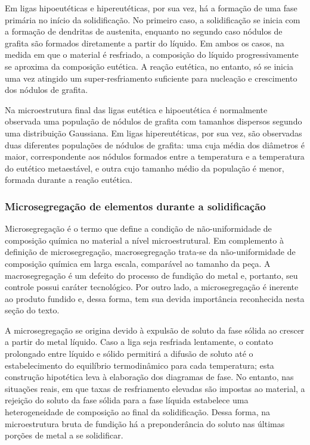 Em ligas hipoeutéticas e hipereutéticas, por sua vez, há a formação de uma fase primária no início da solidificação. No primeiro caso, a solidificação se inicia com a formação de dendritas de austenita, enquanto no segundo caso nódulos de grafita são formados diretamente a partir do líquido. Em ambos os casos, na medida em que o material é resfriado, a composição do líquido progressivamente se aproxima da composição eutética. A reação eutética, no entanto, só se inicia uma vez atingido um super-resfriamento suficiente para nucleação e crescimento dos nódulos de grafita\cite{Santos1991}.

Na microestrutura final das ligas eutética e hipoeutética é normalmente observada uma população de nódulos de grafita com tamanhos dispersos segundo uma distribuição Gaussiana. Em ligas hipereutéticas, por sua vez, são observadas duas diferentes populações de nódulos de grafita: uma cuja média dos diâmetros é maior, correspondente aos nódulos formados entre a temperatura  e a temperatura do eutético metaestável, e outra cujo tamanho médio da população é menor, formada durante a reação eutética\cite{Santos1991}. %

\subsubsection{Microsegrega\c{c}\~{a}o de elementos durante a solidifica\c{c}\~{a}o}

Microsegregação é o termo que define a condição de não-uniformidade de composição química no material a nível microestrutural. Em complemento à definição de microsegregação, macrosegregação trata-se da não-uniformidade de composição química em larga escala, comparável ao tamanho da peça. A macrosegregação é um defeito do processo de fundição do metal e, portanto, seu controle possui caráter tecnológico. Por outro lado, a microsegregação é inerente ao produto fundido e, dessa forma, tem sua devida importância reconhecida nesta seção do texto.

A microsegregação se origina devido à expulsão de soluto da fase sólida ao crescer a partir do metal líquido. Caso a liga seja resfriada lentamente, o contato prolongado entre líquido e sólido permitirá a difusão de soluto até o estabelecimento do equilíbrio termodinâmico para cada temperatura; esta construção hipotética leva à elaboração dos diagramas de fase. No entanto, nas situações reais, em que taxas de resfriamento elevadas são impostas ao material, a rejeição do soluto da fase sólida para a fase líquida estabelece uma heterogeneidade de composição ao final da solidificação. Dessa forma, na microestrutura bruta de fundição há a preponderância do soluto nas últimas porções de metal a se solidificar.

